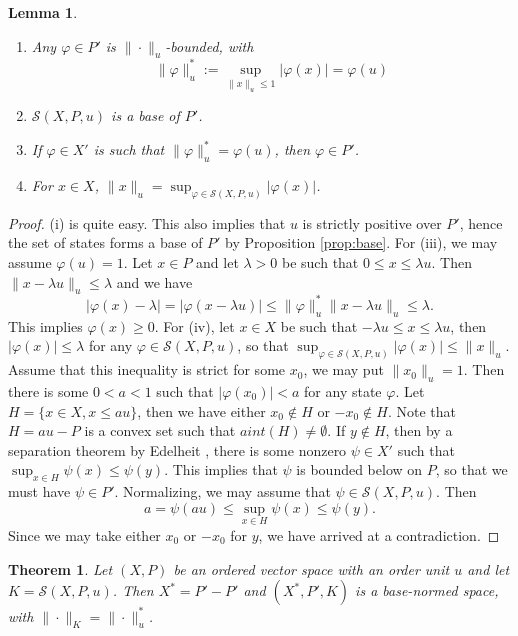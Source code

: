 \documentclass[12pt]{article}
\newtheorem{lemma}{Lemma}
\newtheorem{thm}{Theorem}
\theoremstyle{remark}
\newcommand{\<}{\langle}
\begin{document}
\begin{lemma}\label{lemma:states}
\begin{enumerate}
\item[(i)] Any $\varphi\in P'$ is $\|\cdot\|_u$-bounded, with 
\[
\|\varphi\|_u^*:=\sup_{\|x\|_u\le 1}|\varphi(x)|=\varphi(u)
\]
\item[(ii)] $\mathcal S(X,P,u)$ is a base of $P'$.
\item[(iii)] If $\varphi\in X'$ is such that $\|\varphi\|_u^*=\varphi(u)$, then $\varphi\in P'$.
\item[(iv)] For $x\in X$, $\|x\|_u=\sup_{\varphi\in \mathcal S(X,P,u)} |\varphi(x)|$.
\end{enumerate}


\end{lemma}
\begin{proof}
 (i) is quite easy. This also implies that $u$ is strictly positive over $P'$, hence the set of states forms a base of $P'$ by Proposition \ref{prop:base}. For (iii), we may assume $\varphi(u)=1$. Let $x\in P$ and let $\lambda>0$ be such that $0\le x\le \lambda u$. Then
 $\|x-\lambda u\|_u\le \lambda$ and we have
 \[
|\varphi(x)-\lambda|=|\varphi(x-\lambda u)|\le \|\varphi\|_u^*\|x-\lambda u\|_u\le \lambda.
 \]
This implies $\varphi(x)\ge 0$. For (iv), let $x\in X$ be such that  $-\lambda u\le x\le \lambda u$, then $|\varphi(x)|\le \lambda$ for any $\varphi\in \mathcal S(X,P,u)$, so that $\sup_{\varphi\in \mathcal S(X,P,u)} |\varphi(x)|\le \|x\|_u$. Assume that this inequality is strict for some $x_0$, we may put $\|x_0\|_u=1$. Then there is some $0<a<1$ such that $|\varphi(x_0)|< a$ for any state $\varphi$. Let $H=\{x\in X, x\le au\}$, then we have either $x_0\notin H$ or $-x_0\notin H$. Note that $H=au-P$ is a convex set such that $aint(H)\ne \emptyset$. If $y\notin H$, then by a separation theorem by Edelheit \cite[0.2.4]{jameson}, there is some nonzero $\psi\in X'$ such that $\sup_{x\in H}\psi(x)\le \psi(y)$. This implies that $\psi$ is bounded below on $P$, so that we must have $\psi\in P'$. 
 Normalizing, we may assume that $\psi\in \mathcal S(X,P,u)$. Then
 \[
a=\psi(au)\le\sup_{x\in H}\psi(x)\le \psi(y).
 \]
Since we may take either $x_0$ or $-x_0$ for $y$, we have arrived at a contradiction.

\end{proof}



\begin{thm}\label{thm:ou_dual} Let $(X,P)$ be an ordered vector space with an order unit $u$ and let $K=\mathcal S(X,P,u)$.
Then $X^*=P'-P'$   and  $(X^*,P',K)$  is a base-normed space, with $\|\cdot\|_K=\|\cdot\|_u^*$. 

\end{thm}
\end{document}
